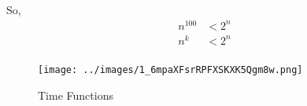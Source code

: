 \documentclass[]{article}
\begin{document}
So, 
\[
\begin{aligned}
    n^{100} &< 2^n \\
    n^k &< 2^n \\
\end{aligned}
\]

\begin{figure}[H]
    \centering
    \texttt{[image: ../images/1\_6mpaXFsrRPFXSKXK5Qgm8w.png]}
    \caption{Time Functions}
\end{figure}
\end{document}
